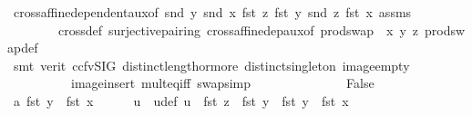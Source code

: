\begin{isabellebody}
\ cross{\isacharunderscore}{\kern0pt}affine{\isacharunderscore}{\kern0pt}dependent{\isacharunderscore}{\kern0pt}aux{}{\isacharbrackleft}{\kern0pt}of\ {\isachardoublequoteopen}snd\ y{\isachardoublequoteclose}\ {\isachardoublequoteopen}snd\ x{\isachardoublequoteclose}\ {\isachardoublequoteopen}fst\ z{\isachardoublequoteclose}\ {\isachardoublequoteopen}fst\ y{\isachardoublequoteclose}\ {\isachardoublequoteopen}snd\ z{\isachardoublequoteclose}\ {\isachardoublequoteopen}fst\ x{\isachardoublequoteclose}{\isacharbrackright}{\kern0pt}\ assms{\isacharparenleft}{\kern0pt}{}{\isacharcomma}{\kern0pt}{}{\isacharparenright}{\kern0pt}\isanewline
\ \ \ \ \ \ \ \ cross{}{\isacharunderscore}{\kern0pt}def\ surjective{\isacharunderscore}{\kern0pt}pairing\ cross{\isacharunderscore}{\kern0pt}affine{\isacharunderscore}{\kern0pt}dep{\isacharunderscore}{\kern0pt}aux{}{\isacharbrackleft}{\kern0pt}of\ {\isachardoublequoteopen}{\isacharparenleft}{\kern0pt}prod{\isachardot}{\kern0pt}swap\ {\isacharbackquote}{\kern0pt}\ {\isacharbraceleft}{\kern0pt}x{\isacharcomma}{\kern0pt}\ y{\isacharcomma}{\kern0pt}\ z{\isacharbraceright}{\kern0pt}{\isacharparenright}{\kern0pt}{\isachardoublequoteclose}{\isacharbrackright}{\kern0pt}\ prod{\isachardot}{\kern0pt}swap{\isacharunderscore}{\kern0pt}def\isanewline
\ \ \ \ \ \ \isamarkupfalse%
\ {\isacharparenleft}{\kern0pt}smt\ {\isacharparenleft}{\kern0pt}verit{\isacharcomma}{\kern0pt}\ ccfv{\isacharunderscore}{\kern0pt}SIG{\isacharparenright}{\kern0pt}\ distinct{\isacharunderscore}{\kern0pt}length{\isacharunderscore}{\kern0pt}{}{\isacharunderscore}{\kern0pt}or{\isacharunderscore}{\kern0pt}more\ distinct{\isacharunderscore}{\kern0pt}singleton\ image{\isacharunderscore}{\kern0pt}empty\isanewline
\ \ \ \ \ \ \ \ \ \ image{\isacharunderscore}{\kern0pt}insert\ mult{\isacharunderscore}{\kern0pt}eq{\isacharunderscore}{\kern0pt}{}{\isacharunderscore}{\kern0pt}iff\ swap{\isacharunderscore}{\kern0pt}simp{\isacharparenright}{\kern0pt}\ \ \ \ \ \ \isanewline
\ \ \isamarkupfalse%
\isanewline
\ \ \ \ \isamarkupfalse%
\ False\isanewline
\ \ \ \ \isamarkupfalse%
\ a{}{\isacharcolon}{\kern0pt}\ {\isachardoublequoteopen}fst\ y\ {\isasymnoteq}\ fst\ x{\isachardoublequoteclose}\isanewline
\ \ \ \ \isamarkupfalse%
\ {\isachardoublequoteopen}u{\isachardoublequoteclose}\ \ u{\isacharunderscore}{\kern0pt}def{\isacharcolon}{\kern0pt}\ {\isachardoublequoteopen}u\ {\isacharequal}{\kern0pt}\ {\isacharparenleft}{\kern0pt}fst\ z\ {\isacharminus}{\kern0pt}\ fst\ y{\isacharparenright}{\kern0pt}\ {\isacharslash}{\kern0pt}\ {\isacharparenleft}{\kern0pt}fst\ y\ {\isacharminus}{\kern0pt}\ fst\ x{\isacharparenright}{\kern0pt}{\isachardoublequoteclose}\isanewline

\end{isabellebody}
